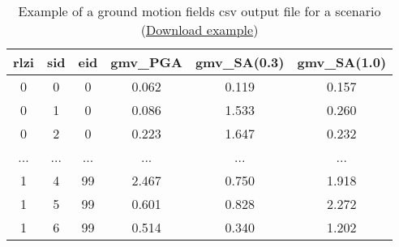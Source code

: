 \begin{table}[htbp]
\centering
\begin{tabular}{cccccc}

\hline
\rowcolor{lightgray}
\textbf{rlzi} & \textbf{sid} & \textbf{eid} & \textbf{gmv\_PGA} & \textbf{gmv\_SA(0.3)} & \textbf{gmv\_SA(1.0)} \\
\hline
0 & 0 & 0 & 0.062 & 0.119 & 0.157 \\
0 & 1 & 0 & 0.086 & 1.533 & 0.260 \\
0 & 2 & 0 & 0.223 & 1.647 & 0.232 \\
... & ... & ... & ... & ... & ... \\
1 & 4 & 99 & 2.467 & 0.750 & 1.918 \\
1 & 5 & 99 & 0.601 & 0.828 & 2.272 \\
1 & 6 & 99 & 0.514 & 0.340 & 1.202 \\
\hline

\end{tabular}
\caption{Example of a ground motion fields csv output file for a scenario (\href{https://raw.githubusercontent.com/gem/oq-engine/master/doc/manual/oqum/hazard/verbatim/output_scenario_gmfs.csv}{Download example})}
\label{output:gmf_scenario}
\end{table}